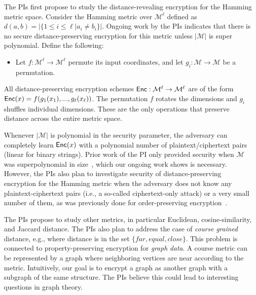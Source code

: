 The PIs first propose to study the distance-revealing encryption for the Hamming metric space.
Consider the Hamming metric over $\mathcal{M}^\ell$ defined as $d(a,b) = | \{ 1\le i\le \ell | a_i \neq b_i\}|$.  Ongoing work by the PIs indicates that there is no secure distance-preserving encryption for this metric unless $|\mathcal{M}|$ is super polynomial.  Define the following: 
\begin{itemize}\setlength\itemsep{0em}
\item Let $f: \mathcal{M}^\ell \rightarrow \mathcal{M}^\ell$ permute its input coordinates, and let $g_i: \mathcal{M}\rightarrow \mathcal{M}$ be a permutation.
\end{itemize}
All distance-preserving encryption schemes $\mathsf{Enc}: \mathcal{M}^\ell\rightarrow \mathcal{M}^\ell$ are of the form $\mathsf{Enc}(x) = f(g_1(x_1),..., g_\ell(x_\ell))$.  The permutation $f$ rotates the dimensions and $g_i$ shuffles individual dimensions.  These are the only operations that preserve distance across the entire metric space.

Whenever $|\mathcal{M}|$ is polynomial in the security parameter, the adversary can completely learn $\mathsf{Enc}(x)$ with a polynomial number of plaintext/ciphertext pairs (linear for binary strings).  Prior work of the PI only provided security when $\mathcal{M}$ was superpolynomial in size~\cite{EPRINT:ABCFG16}, which our ongoing work shows is necessary.  However, the PIs also plan to investigate security of distance-preserving encryption for the Hamming metric when the adversary does not know any plaintext-ciphertext pairs (i.e., a so-called ciphertext-only attack) or a very small number of them, as was previously done for order-preserving encryption~\cite{C:BolCheONe11}.
 
 The PIs propose to study other metrics, in particular Euclidean, cosine-similarity, and Jaccard distance.    The PIs also plan to address the case of \emph{course grained} distance, e.g., where distance is in the set $\{far, equal, close\}$.  This problem is connected to property-preserving encryption for \emph{graph data}.  A course metric can be represented by a graph where neighboring vertices are near according to the metric.  Intuitively, our goal is to encrypt a graph as another graph with a subgraph of the same structure. The PIs believe this could lead to interesting questions in graph theory.

